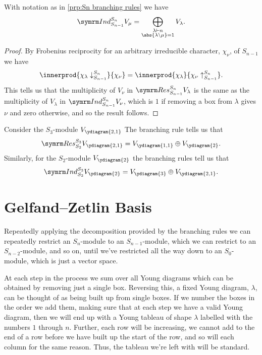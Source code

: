 \begin{crl}{}{}
    With notation as in \cref{prp:Sn branching rules} we have
    \begin{equation}
        \Ind^{S_n}_{S_{n-1}} V_\mu = \bigoplus_{\substack{\lambda \partition n\\ \abs{\lambda\setminus \mu} = 1}} V_\lambda.
    \end{equation}
    \begin{proof}
        By Frobenius reciprocity for an arbitrary irreducible character, \(\chi_\nu\), of \(S_{n-1}\) we have
        \begin{equation}
            \innerprod{\chi_\lambda\downarrow^{S_n}_{S_{n-1}}}{\chi_\nu} = \innerprod{\chi_\lambda}{\chi_\nu\uparrow^{S_n}_{S_{n-1}}}.
        \end{equation}
        This tells us that the multiplicity of \(V_\nu\) in \(\Res^{S_n}_{S_{n-1}}V_\lambda\) is the same as the multiplicity of \(V_\lambda\) in \(\Ind^{S_n}_{S_{n-1}}V_\nu\), which is \(1\) if removing a box from \(\lambda\) gives \(\nu\) and zero otherwise, and so the result follows.
    \end{proof}
\end{crl}

\begin{exm}{}{}
    Consider the \(S_3\)-module \(V_{\ydiagram{2,1}}\)
    The branching rule tells us that
    \begin{equation}
        \Res^{S_3}_{S_2} V_{\ydiagram{2,1}} = V_{\ydiagram{1,1}} \oplus V_{\ydiagram{2}}.
    \end{equation}
    Similarly, for the \(S_2\)-module \(V_{\ydiagram{2}}\) the branching rules tell us that
    \begin{equation}
        \Ind^{S_3}_{S_2} V_{\ydiagram{2}} = V_{\ydiagram{3}} \oplus V_{\ydiagram{2,1}}.
    \end{equation}
\end{exm}

\section{Gelfand--Zetlin Basis}
Repeatedly applying the decomposition provided by the branching rules we can repeatedly restrict an \(S_n\)-module to an \(S_{n-1}\)-module, which we can restrict to an \(S_{n-2}\)-module, and so on, until we've restricted all the way down to an \(S_0\)-module, which is just a vector space.

At each step in the process we sum over all Young diagrams which can be obtained by removing just a single box.
Reversing this, a fixed Young diagram, \(\lambda\), can be thought of as being built up from single boxes.
If we number the boxes in the order we add them, making sure that at each step we have a valid Young diagram, then we will end up with a Young tableau of shape \(\lambda\) labelled with the numbers \(1\) through \(n\).
Further, each row will be increasing, we cannot add to the end of a row before we have built up the start of the row, and so will each column for the same reason.
Thus, the tableau we're left with will be standard.


